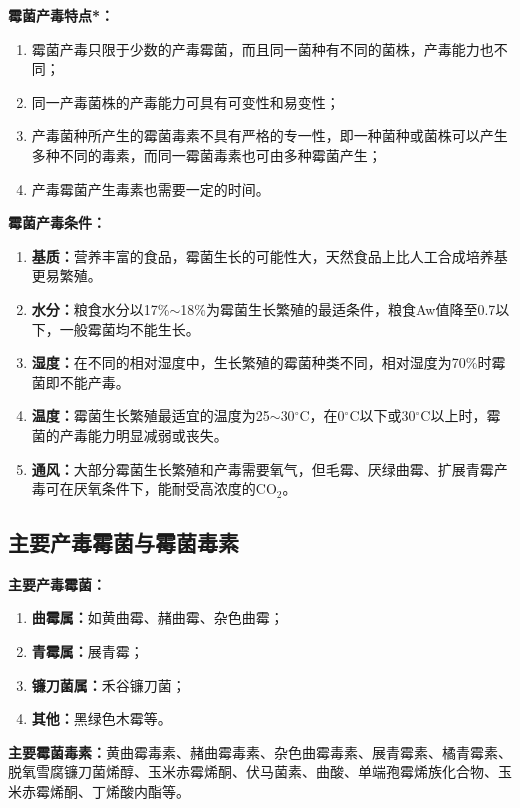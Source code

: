 \begin{defbox}
\textbf{霉菌产毒特点*：}
\begin{enumerate}[leftmargin=*]
    \item 霉菌产毒只限于少数的产毒霉菌，而且同一菌种有不同的菌株，产毒能力也不同；
    \item 同一产毒菌株的产毒能力可具有可变性和易变性；
    \item 产毒菌种所产生的霉菌毒素不具有严格的专一性，即一种菌种或菌株可以产生多种不同的毒素，而同一霉菌毒素也可由多种霉菌产生；
    \item 产毒霉菌产生毒素也需要一定的时间。
\end{enumerate}

\textbf{霉菌产毒条件：}
\begin{enumerate}[leftmargin=*]
    \item \textbf{基质：}营养丰富的食品，霉菌生长的可能性大，天然食品上比人工合成培养基更易繁殖。
    \item \textbf{水分：}粮食水分以17\%$\sim$18\%为霉菌生长繁殖的最适条件，粮食Aw值降至0.7以下，一般霉菌均不能生长。
    \item \textbf{湿度：}在不同的相对湿度中，生长繁殖的霉菌种类不同，相对湿度为70\%时霉菌即不能产毒。
    \item \textbf{温度：}霉菌生长繁殖最适宜的温度为25$\sim$30$^\circ$C，在0$^\circ$C以下或30$^\circ$C以上时，霉菌的产毒能力明显减弱或丧失。
    \item \textbf{通风：}大部分霉菌生长繁殖和产毒需要氧气，但毛霉、厌绿曲霉、扩展青霉产毒可在厌氧条件下，能耐受高浓度的CO$_2$。
\end{enumerate}
\end{defbox}


\subsection{主要产毒霉菌与霉菌毒素}

\begin{defbox}
\textbf{主要产毒霉菌：}
\begin{enumerate}[leftmargin=*]
    \item \textbf{曲霉属：}如黄曲霉、赭曲霉、杂色曲霉；
    \item \textbf{青霉属：}展青霉；
    \item \textbf{镰刀菌属：}禾谷镰刀菌；
    \item \textbf{其他：}黑绿色木霉等。
\end{enumerate}

\textbf{主要霉菌毒素：}黄曲霉毒素、赭曲霉毒素、杂色曲霉毒素、展青霉素、橘青霉素、脱氧雪腐镰刀菌烯醇、玉米赤霉烯酮、伏马菌素、曲酸、单端孢霉烯族化合物、玉米赤霉烯酮、丁烯酸内酯等。
\end{defbox}

